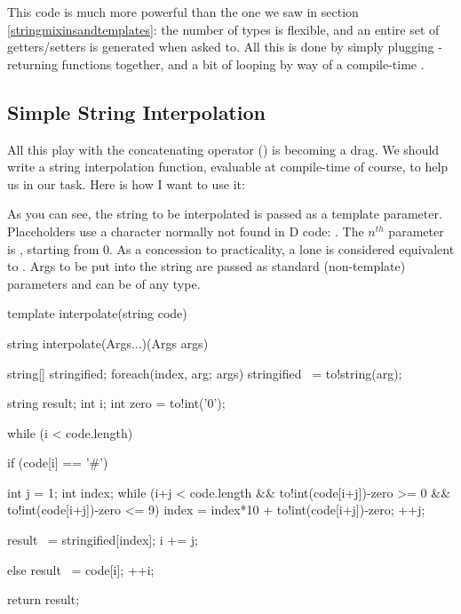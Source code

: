 This code is much more powerful than the one we saw in section \ref{stringmixinsandtemplates}: the number of types is flexible, and an entire set of getters/setters is generated when asked to. All this is done by simply plugging -returning functions together, and a bit of looping by way of a compile-time .

\subsection{Simple String Interpolation}\label{stringinterpolation}

All this play with the concatenating operator (\DD{\~}) is becoming a drag. We should write a string interpolation function, evaluable at compile-time of course, to help us in our task. Here is how I want to use it:


As you can see, the string to be interpolated is passed as a template parameter. Placeholders use a character normally not found in D code: \DD{\#}. The $n^{th}$ parameter is , starting from 0. As a concession to practicality, a lone \DD{\#} is considered equivalent to . Args to be put into the string are passed as standard (non-template) parameters and can be of any type.

\begin{dcode}
template interpolate(string code)
{
    string interpolate(Args...)(Args args) {
        string[] stringified;
        foreach(index, arg; args) stringified ~= to!string(arg);

        string result;
        int i;
        int zero = to!int('0');

        while (i < code.length) {
            if (code[i] == '#') {
                int j = 1;
                int index;
                while (i+j < code.length
                    && to!int(code[i+j])-zero >= 0
                    && to!int(code[i+j])-zero <= 9)
                {
                    index = index*10 + to!int(code[i+j])-zero;
                    ++j;
                }

                result ~= stringified[index];
                i += j;
            }
            else {
                result ~= code[i];
                ++i;
            }
        }

        return result;
    }
}
\end{dcode}

